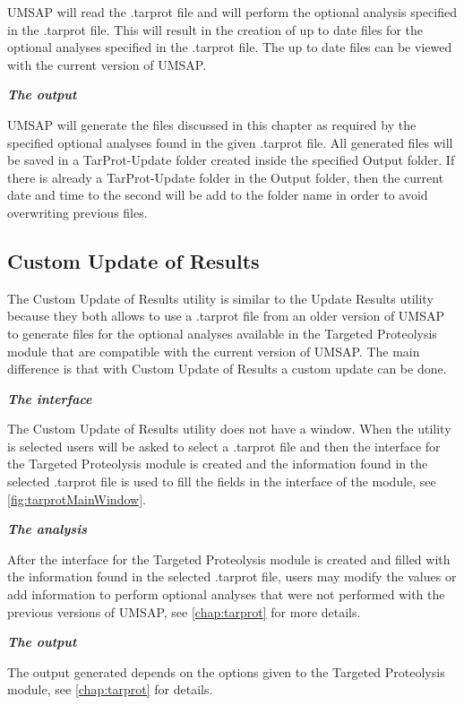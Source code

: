 UMSAP will read the .tarprot file and will perform the optional analysis specified in the .tarprot file. This will result in the creation of up to date files for the optional analyses specified in the .tarprot file. The up to date files can be viewed with the current version of UMSAP.

\textit{\textbf{The output}}

UMSAP will generate the files discussed in this chapter as required by the specified optional analyses found in the given .tarprot file. All generated files will be saved in a TarProt-Update folder created inside the specified Output folder. If there is already a TarProt-Update folder in the Output folder, then the current date and time to the second will be add to the folder name in order to avoid overwriting previous files. 

\subsection{Custom Update of Results }
\label{subsec:utilReanalyzeTarprot}

The Custom Update of Results utility is similar to the Update Results utility because they both allows to use  a .tarprot file from an older version of UMSAP to generate files for the optional analyses available in the Targeted Proteolysis module that are compatible with the current version of UMSAP. The main difference is that with Custom Update of Results a custom update can be done.

\textit{\textbf{The interface}}

The Custom Update of Results utility does not have a window. When the utility is selected users will be asked to select a .tarprot file and then the interface for the Targeted Proteolysis module is created and the information found in the selected .tarprot file is used to fill the fields in the interface of the module, see \autoref{fig:tarprotMainWindow}.

\textit{\textbf{The analysis}}

After the interface for the Targeted Proteolysis module is created and filled with the information found in the selected .tarprot file, users may modify the values or add information to perform optional analyses that were not performed with the previous versions of UMSAP, see \autoref{chap:tarprot} for more details.

\textit{\textbf{The output}}    

The output generated depends on the options given to the Targeted Proteolysis module, see \autoref{chap:tarprot} for details.

